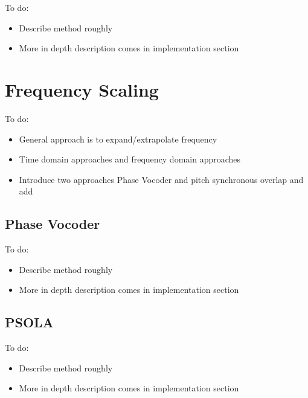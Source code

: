 \color{red}
To do:
\begin{itemize}
	\item Describe method roughly
	\item More in depth description comes in implementation section
\end{itemize}
\color{black}

\section{Frequency Scaling}

\color{red}
To do:
\begin{itemize}
	\item General approach is to expand/extrapolate frequency
	\item Time domain approaches and frequency domain approaches
	\item Introduce two approaches Phase Vocoder and pitch synchronous overlap and add
\end{itemize}
\color{black}

\subsection{Phase Vocoder}

\color{red}
To do:
\begin{itemize}
	\item Describe method roughly
	\item More in depth description comes in implementation section
\end{itemize}
\color{black}

\subsection{PSOLA}

\color{red}
To do:
\begin{itemize}
	\item Describe method roughly
	\item More in depth description comes in implementation section
\end{itemize}
\color{black}
